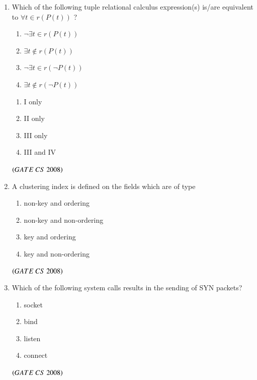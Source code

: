 \documentclass[journal, onecolumn]{IEEEtran}
\numberwithin{equation}{enumi}
\numberwithin{figure}{enumi}
\begin{document}
\begin{enumerate}
\item Which of the following tuple relational calculus expression(s) is/are equivalent to $\forall t \in r \left(P(t)\right)$ ?
\begin{enumerate} [label=\Roman*.]
   \item $\neg \exists t \in r \left(P(t)\right)$
   \item $\exists t \notin r \left(P(t)\right)$
   \item $\neg \exists t \in r \left (\neg P(t)\right)$
   \item $ \exists t \notin r \left (\neg P(t)\right)$
\end{enumerate}
\vspace{-1em}%
\begin{multicols}{4}
\begin{enumerate}
    \item I only
    \item II only
    \item III only
    \item III and IV
\end{enumerate}
\end{multicols}
\hfill $\left(GATE\ CS\  2008\right)$

\item A clustering index is defined on the fields which are of type
\vspace{-1em}%
\begin{multicols}{2}
\begin{enumerate}
    \item  non-key and ordering
    \item  non-key and non-ordering
    \item key and ordering
    \item key and non-ordering
\end{enumerate}
\end{multicols}
\hfill $\left(GATE\ CS\  2008\right)$

\item Which of the following system calls results in the sending of SYN packets? 
\vspace{-1em}%
\begin{multicols}{4}
\begin{enumerate}
    \item socket
    \item bind
    \item listen
    \item connect
\end{enumerate}
\end{multicols}
\hfill $\left(GATE\ CS\  2008\right)$


\end{enumerate}
\end{document}

